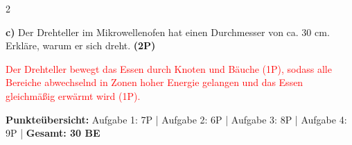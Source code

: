 \documentclass[11pt,a4paper]{article}
\begin{document}
\begin{multicols}{2}
\begin{tcolorbox}[colback=white,colframe=black,coltitle=black,colbacktitle=white,
    title=\textbf{4: Anwendung und Transfer}]
\vspace{0.2cm}

\textbf{c)} Der Drehteller im Mikrowellenofen hat einen Durchmesser von ca. 30 cm. Erkläre, warum er sich dreht. \textbf{(2P)}

\textcolor{red}{Der Drehteller bewegt das Essen durch Knoten und Bäuche {\color{blue}(1P)}, sodass alle Bereiche abwechselnd in Zonen hoher Energie gelangen und das Essen gleichmäßig erwärmt wird {\color{blue}(1P)}.}

\end{tcolorbox}

\end{multicols}

\vspace{0.5cm}
\begin{center}
\textbf{Punkteübersicht:} Aufgabe 1: 7P | Aufgabe 2: 6P | Aufgabe 3: 8P | Aufgabe 4: 9P | \textbf{Gesamt: 30 BE}
\end{center}
\end{document}
